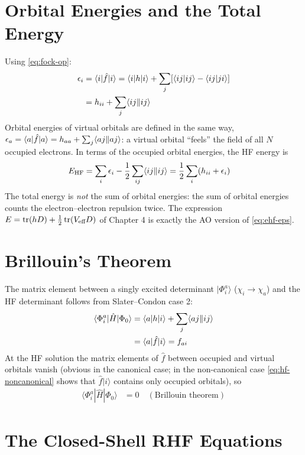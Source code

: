 \section{Orbital Energies and the Total Energy}

Using \eqref{eq:fock-op}:
\begin{align*}
\epsilon_i &= \langle i | \hat{f} | i \rangle = \langle i | h | i \rangle + \sum_j [\langle ij\vert ij\rangle - \langle ij\vert ji\rangle] \\
&= h_{ii} + \sum_j \langle ij\Vert ij\rangle
\end{align*}
Orbital energies of virtual orbitals are defined in the same way, $\epsilon_a = \langle a|\hat{f}|a\rangle = h_{aa} + \sum_j \langle aj\Vert aj\rangle$: a virtual orbital ``feels'' the field of all $N$ occupied electrons. In terms of the occupied orbital energies, the HF energy is
\begin{align}\label{eq:ehf-eps}
E_{\text{HF}} &= \sum_i \epsilon_i - \frac{1}{2} \sum_{ij} \langle ij\Vert ij\rangle = \frac{1}{2} \sum_i (h_{ii} + \epsilon_i)
\end{align}
The total energy is \emph{not} the sum of orbital energies: the sum of orbital energies counts the electron--electron repulsion twice. The expression $E = \operatorname{tr}(h D) + \frac{1}{2} \operatorname{tr}(V_{\text{eff}} D)$ of Chapter 4 is exactly the AO version of \eqref{eq:ehf-eps}.

\section{Brillouin's Theorem}

The matrix element between a singly excited determinant $|\Phi_i^a\rangle$ ($\chi_i \rightarrow \chi_a$) and the HF determinant follows from Slater--Condon case 2:
\begin{align*}
\langle \Phi_i^a | \hat{H} | \Phi_0 \rangle &= \langle a | h | i \rangle + \sum_j \langle aj\Vert ij\rangle \\
&= \langle a | \hat{f} | i \rangle = f_{ai}
\end{align*}
At the HF solution the matrix elements of $\hat{f}$ between occupied and virtual orbitals vanish (obvious in the canonical case; in the non-canonical case \eqref{eq:hf-noncanonical} shows that $\hat{f}|i\rangle$ contains only occupied orbitals), so
\begin{align*}
\langle \Phi_i^a | \hat{H} | \Phi_0 \rangle &= 0 \quad (\text{Brillouin theorem})
\end{align*}

\section{The Closed-Shell RHF Equations}

